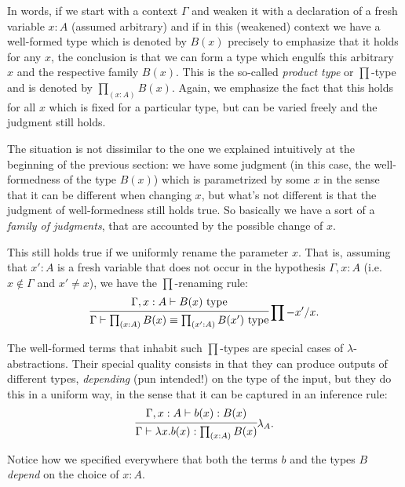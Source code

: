 In words, if we start with a context $ \Gamma $ and weaken it with
a declaration of a fresh variable $ x : A $ (assumed arbitrary)
and if in this (weakened) context we have a well-formed type
which is denoted by $ B(x) $ precisely to emphasize that it holds for
any $ x $, the conclusion is that we can form a type which engulfs
this arbitrary $ x $ and the respective family $ B(x) $. This is the
so-called \emph{product type} or $ \prod $-type and is denoted by
$ \prod_{(x : A)} B(x) $. Again, we emphasize the fact that this holds
for all $ x $ which is fixed for a particular type, but can be varied
freely and the judgment still holds.

The situation is not dissimilar to the one we explained intuitively at
the beginning of the previous section: we have some judgment (in this case,
the well-formedness of the type $ B(x) $) which is parametrized by
some $ x $ in the sense that it can be different when changing $ x $,
but what's not different is that the judgment of well-formedness
still holds true. So basically we have a sort of a \emph{family of %
  judgments}, that are accounted by the possible change of $ x $.

This still holds true if we uniformly rename the parameter $ x $.
That is, assuming that $ x' : A $ is a fresh variable that does not
occur in the hypothesis $ \Gamma, x : A $ (i.e.\ $ x \notin \Gamma $
and $ x' \neq x $), we have the $ \prod $-renaming rule:
\[
  \begin{prooftree}
    \hypo{\Gamma, x : A \vdash B(x) \text{ type}}
    \infer1{\Gamma \vdash \prod_{(x : A)} B(x) \equiv %
      \prod_{(x' : A)} B(x') \text{ type}}
  \end{prooftree} \prod-x'/x.
\]

The well-formed terms that inhabit such $ \prod $-types are special cases
of $ \lambda $-abstractions. Their special quality consists in that they
can produce outputs of different types, \emph{depending} (pun intended!)
on the type of the input, but they do this in a uniform way, in the sense
that it can be captured in an inference rule:
\[
  \begin{prooftree}
    \hypo{\Gamma, x : A \vdash b(x) : B(x)}
    \infer1{\Gamma \vdash \lambda x.b(x) : \prod_{(x : A)} B(x)}
  \end{prooftree} \lambda_A.
\]

Notice how we specified everywhere that both the terms $ b $ and the
types $ B $ \emph{depend} on the choice of $ x : A $.

